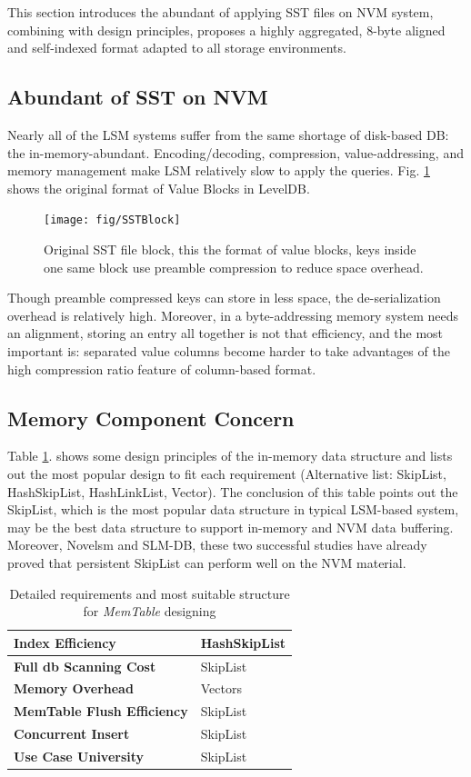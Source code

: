 This section introduces the abundant of applying SST files on NVM system, combining with design principles, proposes a highly aggregated, 8-byte aligned and self-indexed format adapted to all storage environments.

\subsection{Abundant of SST on NVM}
Nearly all of the LSM systems suffer from the same shortage of disk-based DB\cite{sauer2018fineline}: the in-memory-abundant. Encoding/decoding, compression, value-addressing, and memory management make LSM relatively slow to apply the queries. Fig. \ref{fig:sstblock} shows the original format of Value Blocks in LevelDB.

\begin{figure}
	\centering
	\texttt{[image: fig/SSTBlock]}
	\caption{Original SST file block, this the format of value blocks, keys inside one same block use preamble compression to reduce space overhead.}
	\label{fig:sstblock}
\end{figure}
Though preamble compressed keys can store in less space, the de-serialization overhead is relatively high. Moreover, in a byte-addressing memory system needs an alignment, storing an entry all together is not that efficiency, and the most important is: separated value columns become harder to take advantages of the high compression ratio feature of column-based format.


\subsection{Memory Component Concern}
Table \ref{tab:memtable_requirment}. shows some design principles of the in-memory data structure and lists out the most popular design to fit each requirement\cite{MemTable29:online} (Alternative list: SkipList, HashSkipList, HashLinkList, Vector). The conclusion of this table points out the SkipList, which is the most popular data structure in typical LSM-based system, may be the best data structure to support in-memory and NVM data buffering. Moreover, Novelsm\cite{kannan2018redesigning} and SLM-DB\cite{kaiyrakhmet2019slm}, these two successful studies have already proved that persistent SkipList can perform well on the NVM material.
\begin{table}
	\centering
	\begin{tabular}{|p{}|p{}|}
		\hline
		\textbf{Index Efficiency} & HashSkipList \\ \hline
		\textbf{Full db Scanning Cost} & SkipList \\ \hline
		\textbf{Memory Overhead} & Vectors \\ \hline
		\textbf{MemTable Flush Efficiency} & SkipList \\ \hline
		\textbf{Concurrent Insert} & SkipList \\ \hline
		\textbf{Use Case University} & SkipList\\ \hline
	\end{tabular}
	\caption{Detailed requirements and most suitable structure for \textit{MemTable} designing}
	\label{tab:memtable_requirment}
\end{table}


